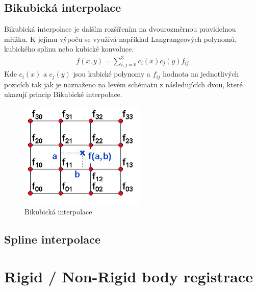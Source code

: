 \documentclass{thesis}%
\begin{document}
 \subsection{Bikubická interpolace}
 Bikubická interpolace je dalším rozšířením na  dvourozměrnou pravidelnou mřížku. K jejímu výpoču se využívá například Langrangeových polynomů, kubického splinu nebo kubické konvoluce.
 \begin{equation}
\begin{split}
f(x,y) = \sum\limits_{i,j=0}^3 c_{i}(x)c_{j}(y)f_{ij}
\end{split}
\end{equation}
Kde $c_{i}(x)$ a $c_{j}(y)$  jsou kubické polynomy a $f_{ij}$ hodnota na jednotlivých pozicích tak jak je naznaženo na levém schématu z následujících dvou, které ukazují princip Bikubické interpolace.
 \begin{figure}[ht!]
  \centering
	\includegraphics[width=6cm]{bikubicka2.png}

	\caption[Bikubická interpolace]{Bikubická interpolace}
\end{figure}
 \subsection{Spline interpolace}
\section{Rigid / Non-Rigid body registrace}
\end{document}
